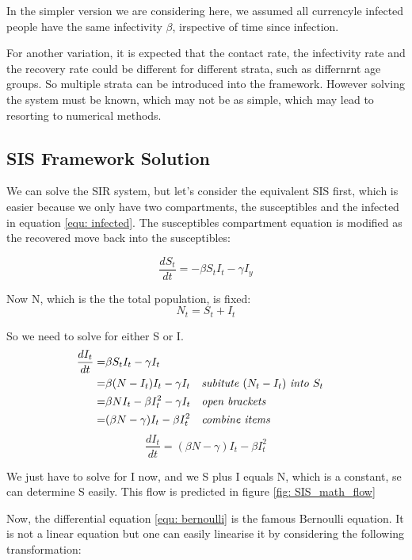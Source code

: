\documentclass[fontsize=17pt]{article}
\begin{document}
In the simpler version we are considering here, we assumed all currencyle infected people have the same infectivity $\beta$, irspective of time since infection.

For another variation, it is expected that the contact rate, the infectivity rate and the recovery rate could be different for different strata, such as differnrnt age groups. So multiple strata can be introduced into the framework. However solving the system must be known, which may not be as simple, which may lead to resorting to numerical methods.


\subsection{SIS Framework Solution}\label{sec: SIS_solution}
We can solve the SIR system, but let's consider the equivalent SIS first, which is easier because we only have two compartments, the susceptibles and the infected in equation \ref{equ: infected}. The susceptibles compartment equation is modified as the recovered move back into the susceptibles: 

\begin{equation}
\frac{dS_{t}}{dt}=-\beta S_{t}I_{t}-\gamma I_{y}
\end{equation}

Now N, which is the the total population, is fixed:
\begin{equation}
N_{t}=S_{t}+I_{t}
\end{equation}

So we need to solve for either S or I.
 \begin{align*}
\frac{dI_{t}}{dt}=&\beta S_{t}I_{t}-\gamma I_{t} \\
=&\beta (N-I_{t})I_{t}-\gamma I_{t} && \text{\textit{subitute} }(N_{t}-I_{t})\text{ \textit{into} }S_{t}\\
=&\beta NI_{t}-\beta I_{t}^{2}-\gamma I_{t} && \text{\textit{open brackets}}\\
=&(\beta N-\gamma)I_{t}-\beta I_{t}^{2}&& \text{\textit{combine items}}
\end{align*}
 \begin{equation}\label{equ: bernoulli}
\frac{dI_{t}}{dt}=(\beta N-\gamma)I_{t}-\beta I_{t}^{2}
\end{equation}

We just have to solve for I now, and we S plus I equals N, which is a constant, se can determine S easily. This flow is predicted in figure \ref{fig: SIS_math_flow}

Now, the differential equation \ref{equ: bernoulli} is the famous Bernoulli equation. It is not a linear equation but one can easily linearise it by considering the following transformation:
\end{document}
